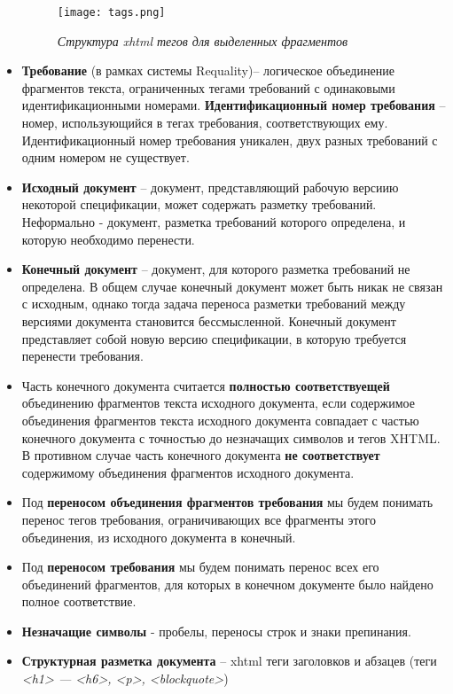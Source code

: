 \begin{itemize}
\begin{figure}[h]
\begin{center}
\texttt{[image: tags.png]}
\caption{\emph{Структура xhtml тегов для выделенных фрагментов}}
\label{intro:image3}
\end{center}
\end{figure}

\item \textbf{Требование} (в рамках системы Requality)– логическое объединение фрагментов текста, ограниченных тегами требований с одинаковыми идентификационными номерами. \textbf{Идентификационный номер требования} – номер, использующийся в тегах требования, соответствующих ему. Идентификационный номер требования уникален, двух разных требований с одним номером не существует.

\item \textbf{Исходный документ} – документ, представляющий рабочую версиию некоторой спецификации, может содержать разметку требований. Неформально - документ, разметка требований которого определена, и которую необходимо перенести.

\item \textbf{Конечный документ} – документ, для которого разметка требований не определена. В общем случае конечный документ может быть никак не связан с исходным, однако тогда задача переноса разметки требований между версиями документа становится бессмысленной. Конечный документ представляет собой новую версию спецификации, в которую требуется перенести требования.

\item Часть конечного документа считается \textbf{полностью соответствуещей} объединению фрагментов текста исходного документа, если содержимое объединения фрагментов текста исходного документа совпадает с частью конечного документа с точностью до незначащих символов и тегов XHTML. В противном случае часть конечного документа \textbf{не соответствует} содержимому объединения фрагментов исходного документа.

\item Под \textbf{переносом объединения фрагментов требования} мы будем понимать перенос тегов требования, ограничивающих все фрагменты этого объединения, из исходного документа в конечный. 

\item Под \textbf{переносом требования} мы будем понимать перенос всех его объединений фрагментов, для которых в конечном документе было найдено полное соответствие. 

\item \textbf{Незначащие символы} - пробелы, переносы строк и знаки препинания.

\item \textbf{Структурная разметка документа} – xhtml теги заголовков и абзацев (теги \emph{<h1> --- <h6>, <p>, <blockquote>})

\end{itemize}